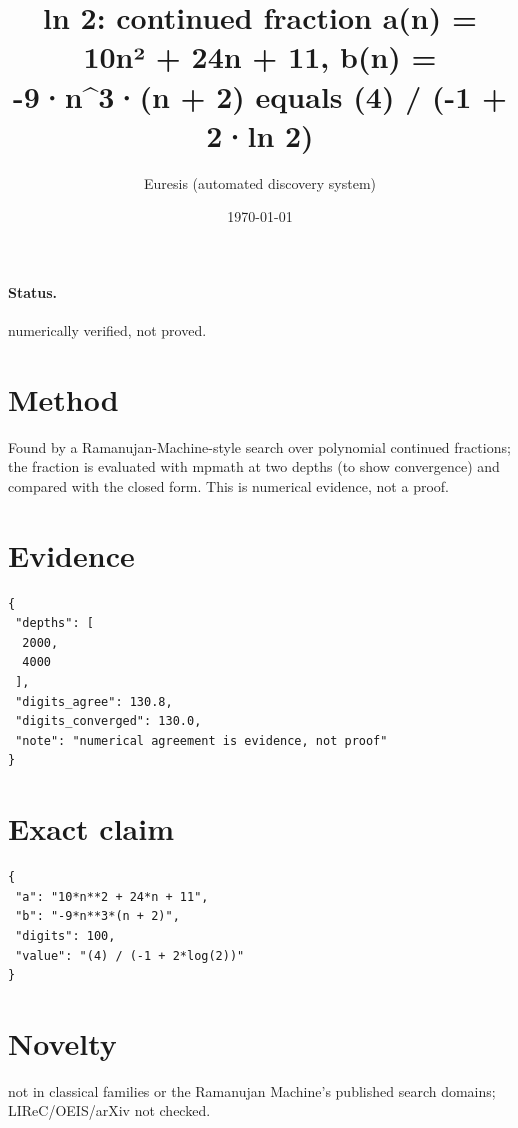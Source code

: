 \documentclass[11pt]{article}
\title{ln 2: continued fraction a(n) = 10n² + 24n + 11, b(n) = -9·n\^{}3·(n + 2) equals (4) / (-1 + 2·ln 2)}
\author{Euresis (automated discovery system)}
\date{\today}
\begin{document}
\maketitle
\paragraph{Status.} numerically verified, not proved.
\section{Method}
Found by a Ramanujan-Machine-style search over polynomial continued fractions; the fraction is evaluated with mpmath at two depths (to show convergence) and compared with the closed form. This is numerical evidence, not a proof.
\section{Evidence}
\begin{verbatim}
{
 "depths": [
  2000,
  4000
 ],
 "digits_agree": 130.8,
 "digits_converged": 130.0,
 "note": "numerical agreement is evidence, not proof"
}
\end{verbatim}
\section{Exact claim}
\begin{verbatim}
{
 "a": "10*n**2 + 24*n + 11",
 "b": "-9*n**3*(n + 2)",
 "digits": 100,
 "value": "(4) / (-1 + 2*log(2))"
}
\end{verbatim}
\section{Novelty}
not in classical families or the Ramanujan Machine's published search domains; LIReC/OEIS/arXiv not checked.
\end{document}
